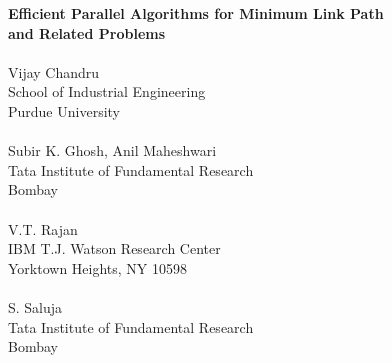 \newpage

\begin{center}
{\large\bf Efficient Parallel Algorithms for 
Minimum Link Path\\
\smallskip
and Related Problems}\\
\quad\\
Vijay Chandru\\
School of Industrial Engineering\\
Purdue University\\
\quad\\
Subir K. Ghosh, Anil Maheshwari\\
Tata Institute of Fundamental Research\\ 
Bombay\\
\quad\\
V.T. Rajan\\
IBM T.J. Watson Research Center\\
Yorktown Heights, NY  10598\\
\quad\\
S. Saluja\\
Tata Institute of Fundamental Research\\ 
Bombay\\
\end{center}

\begin{abstract}
The link metric, defined on a constrained region $R$ of the plane,
sets the distance between a pair of points in $R$ to equal the minimum
number of line segments or links that are needed to construct a path
in $R$ between the points. The minimum link path problem is to compute
the path consisting of the minimum number of links between any pair of
points in $R$, when $R$ is the inside of a simple polygon. The minimum
nested polygon problem asks for a minimum link closed path when $R$ is
an annular region defined by a pair of nested simple polygons.
Efficient sequential algorithms based on greedy methods have been
described for both problems. However, neither problem is known to be
in NC. We will present algorithms that require $O(\log(n)\log\log(n))$
time and $O(n)$ space using $O(n)$ processors for both problems. The
approach used involves new results on the parallel (NC$^1$)
computation of the complete visibility polygon of a simple polygon
from a set of points inside it, with an algebraic technique based on
fractional linear transforms that permits effective parallelization of
the ``greedy'' computations. The complexity results are with respect
to the CREW-PRAM model of computation.
\end{abstract}

